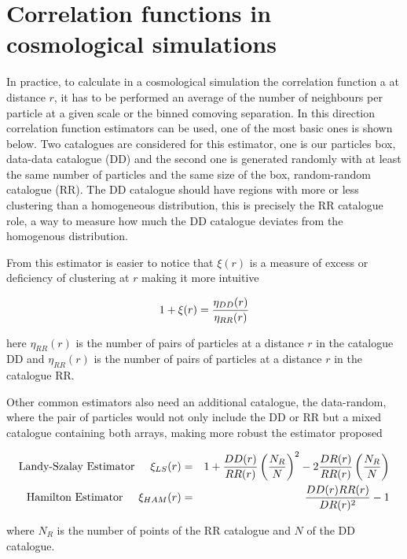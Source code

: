 \section{ Correlation functions in cosmological simulations }


In practice, to calculate in a cosmological simulation the correlation function 
a at distance $r$, it has to be performed an average of the number of neighbours per 
particle at a given scale or the binned comoving separation. In this direction 
correlation function estimators can be used, one of the most basic ones is shown below. 
Two catalogues are considered for this estimator, one is our particles box, 
data-data catalogue (DD) and the second one is generated 
randomly with at least the same number of particles and the same size of the box, 
random-random catalogue (RR). The DD catalogue should have regions with more or
less clustering than a homogeneous distribution, this is precisely the RR catalogue role, 
a way to measure how much the DD catalogue deviates from the homogenous distribution. 

From this estimator is easier to notice that $\xi(r)$ is a measure of 
excess or deficiency of clustering at $r$ making it more intuitive 

\[1+\xi(r)= \frac{\eta_{DD}(r)}{\eta_{RR}(r)}\]

here $\eta_{RR}(r)$ is the number of pairs of particles at a distance $r$ in the catalogue DD 
and $\eta_{RR}(r)$ is the number of pairs of particles at a distance $r$ in the catalogue RR. 

Other common estimators also need an additional catalogue, the data-random, where the
pair of particles would not only include the DD or RR but a mixed catalogue containing 
both arrays, making more robust the estimator proposed

\begin{eqnarray}
\mbox{Landy-Szalay Estimator}\hspace{0.5cm} \xi_{LS}(r)&=& 1+\frac{DD(r)}{RR(r)}\left(\frac{N_R}{N}\right)^2-2\frac{DR(r)}{RR(r)}\left(\frac{N_R}{N}\right) \nonumber \\
\mbox{Hamilton Estimator}  \hspace{0.5cm} \xi_{HAM}(r)&=&\frac{DD(r)RR(r)}{DR(r)^2}-1 \nonumber 
\end{eqnarray}

where $N_R$ is the number of points of the RR catalogue and $N$ of the DD catalogue.